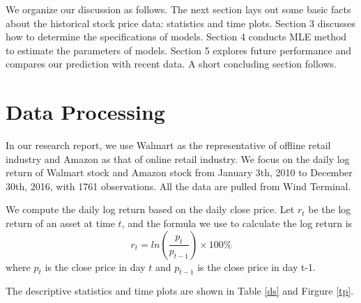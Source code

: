 \documentclass[paper=a4, fontsize=13pt]{article}
\begin{document}
We organize our discussion as follows. The next section lays out some basic facts about the historical stock price data: statistics and time plots. Section 3 discusses how to determine the specifications of models. Section 4 conducts MLE method to estimate the parameters of models. Section 5 explores future performance and compares our prediction with recent data. A short concluding section follows.

\section{Data Processing}
In our research report, we use Walmart as the representative of offline retail industry and Amazon as that of online retail industry. We focus on the daily log return of Walmart stock and Amazon stock from January 3th, 2010 to December 30th, 2016, with 1761 observations. All the data are pulled from Wind Terminal.

We compute the daily log return based on the  daily close price. Let $r_t$ be the log return of an asset at time $t$, and the formula we use to calculate the log return is
\[ r_t = ln(\frac{p_t}{p_{t-1}}) \times 100\% \]
where $p_t$ is the close price in day $t$ and $p_{t-1}$ is the close price in day {t-1}.

The descriptive statistics and time plots are shown in Table \ref{ds} and Firgure \ref{tp}.
\end{document}
